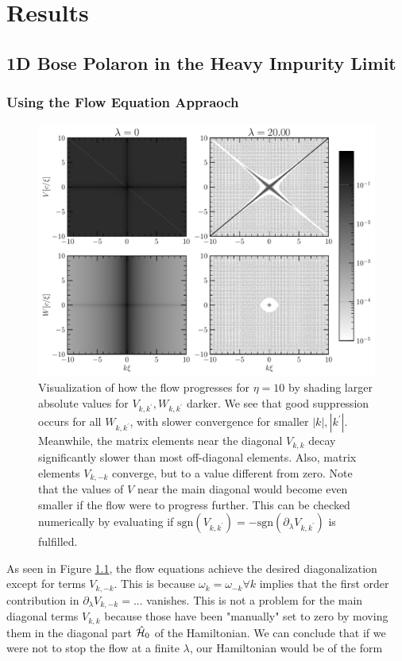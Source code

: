 \chapter{Results}\label{Results}
\section{1D Bose Polaron in the Heavy Impurity Limit}
\subsection{Using the Flow Equation Appraoch}
\begin{figure}[H]
    \centering
    \includegraphics[width=\textwidth]{figures/plots/PDF/FlowIllustration.pdf}
    \caption{Visualization of how the flow progresses for $\eta=10$ by shading larger absolute values for $V_{k,k^\prime},W_{k,k^\prime}$ darker. We see that good suppression occurs for all $W_{k,k^\prime}$, with slower convergence for smaller $|k|,|k^\prime|$.  Meanwhile, the matrix elements near the diagonal $V_{k,k}$ decay significantly slower than most off-diagonal elements. Also, matrix elements $V_{k,-k}$ converge, but to a value different from zero. Note that the values of $V$ near the main diagonal would  become even smaller if the flow were to progress further. This can be checked numerically by evaluating if $\mathrm{sgn}\left( V_{k,k^\prime}\right)=-\mathrm{sgn}\left( \partial_\lambda V_{k,k^\prime}\right)$ is fulfilled.}
    \label{FlowIllustration}
\end{figure}
As seen in Figure \ref{FlowIllustration}, the flow equations achieve the desired diagonalization except for terms $V_{k,-k}$. This is because $\omega_k=\omega_{-k}\forall k$ implies that the first order contribution in $\partial_\lambda V_{k,-k} =...$ vanishes. This is not a problem for the main diagonal terms $V_{k,k}$ because those have been "manually" set to zero by moving them in the diagonal part $\hat{\mathcal{H}}_0$ of the Hamiltonian. We can conclude that if we were not to stop the flow at a finite $\lambda$, our Hamiltonian would be of the form 

